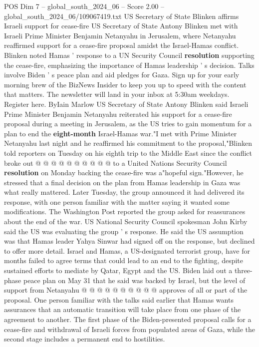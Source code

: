 \begin{textsample}{POS Dim 7 – global\_south\_2024\_06 – Score 2.00 – global\_south\_2024\_06/109067419.txt}  \label{ex:f7_pos_083}
US Secretary of State Blinken affirms Israeli support for cease-fire US Secretary of State Antony Blinken met with Israeli Prime Minister Benjamin Netanyahu in Jerusalem, where Netanyahu reaffirmed support for a cease-fire proposal amidst the Israel-Hamas conflict.
Blinken noted Hamas ' response to a UN Security Council \textbf{resolution} supporting the cease-fire, emphasizing the importance of Hamas leadership ' s decision.
Talks involve Biden ' s peace plan and aid pledges for Gaza.
Sign up for your early morning brew of the BizNews Insider to keep you up to speed with the content that matters.
The newsletter will land in your inbox at 5:30am weekdays.
Register here.
ByIain Marlow US Secretary of State Antony Blinken said Israeli Prime Minister Benjamin Netanyahu reiterated his support for a cease-fire proposal during a meeting in Jerusalem, as the US tries to gain momentum for a plan to end the \textbf{eight-month} Israel-Hamas war."I met with Prime Minister Netanyahu last night and he reaffirmed his commitment to the proposal,"Blinken told reporters on Tuesday on his eighth trip to the Middle East since the conflict broke out @ @ @ @ @ @ @ @ @ @ to a United Nations Security Council \textbf{resolution} on Monday backing the cease-fire was a"hopeful sign."However, he stressed that a final decision on the plan from Hamas leadership in Gaza was what really mattered.
Later Tuesday, the group announced it had delivered its response, with one person familiar with the matter saying it wanted some modifications.
The Washington Post reported the group asked for reassurances about the end of the war.
US National Security Council spokesman John Kirby said the US was evaluating the group ' s response.
He said the US assumption was that Hamas leader Yahya Sinwar had signed off on the response, but declined to offer more detail.
Israel and Hamas, a US-designated terrorist group, have for months failed to agree terms that could lead to an end to the fighting, despite sustained efforts to mediate by Qatar, Egypt and the US.
Biden laid out a three-phase peace plan on May 31 that he said was backed by Israel, but the level of support from Netanyahu @ @ @ @ @ @ @ @ @ @ approves of all or part of the proposal.
One person familiar with the talks said earlier that Hamas wants assurances that an automatic transition will take place from one phase of the agreement to another.
The first phase of the Biden-presented proposal calls for a cease-fire and withdrawal of Israeli forces from populated areas of Gaza, while the second stage includes a permanent end to hostilities.

\end{textsample}
